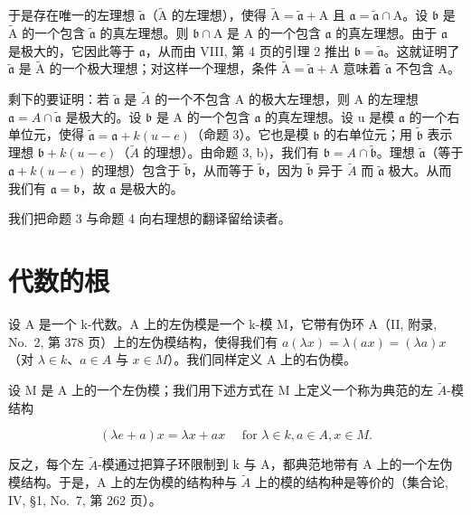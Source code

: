 于是存在唯一的左理想 \(\widetilde{\mathfrak{a}}\)（\(\widetilde{\mathrm{A}}\) 的左理想），使得 \(\widetilde{\mathrm{A}} = \widetilde{\mathfrak{a}} + \mathrm{A}\) 且 \(\mathfrak{a} = \widetilde{\mathfrak{a}} \cap \mathrm{A}\)。设 \(\mathfrak{b}\) 是 \(\widetilde{\mathrm{A}}\) 的一个包含 \(\widetilde{\mathfrak{a}}\) 的真左理想。则 \(\mathfrak{b} \cap \mathrm{A}\) 是 \(\mathrm{A}\) 的一个包含 \(\mathfrak{a}\) 的真左理想。由于 \(\mathfrak{a}\) 是极大的，它因此等于 \(\mathfrak{a}\)，从而由 VIII, 第 4 页的引理 2 推出 \(\mathfrak{b} = \widetilde{\mathfrak{a}}\)。这就证明了 \(\widetilde{\mathfrak{a}}\) 是 \(\widetilde{\mathrm{A}}\) 的一个极大理想；对这样一个理想，条件 \(\widetilde{\mathrm{A}} = \widetilde{\mathfrak{a}} + \mathrm{A}\) 意味着 \(\widetilde{\mathfrak{a}}\) 不包含 A。

剩下的要证明：若 \(\widetilde{\mathfrak{a}}\) 是 \(\tilde{A}\) 的一个不包含 A 的极大左理想，则 A 的左理想 \(\mathfrak{a} = A \cap \widetilde{\mathfrak{a}}\) 是极大的。设 \(\mathfrak{b}\) 是 A 的一个包含 \(\mathfrak{a}\) 的真左理想。设 u 是模 \(\mathfrak{a}\) 的一个右单位元，使得 \(\widetilde{\mathfrak{a}} = \mathfrak{a} + k(u - e)\)（命题 3）。它也是模 \(\mathfrak{b}\) 的右单位元；用 \(\widetilde{\mathfrak{b}}\) 表示理想 \(\mathfrak{b} + k(u - e)\)（\(\tilde{A}\) 的理想）。由命题 3, b)，我们有 \(\mathfrak{b} = A \cap \widetilde{\mathfrak{b}}\)。理想 \(\widetilde{\mathfrak{a}}\)（等于 \(\mathfrak{a} + k(u - e)\) 的理想）包含于 \(\widetilde{\mathfrak{b}}\)，从而等于 \(\widetilde{\mathfrak{b}}\)，因为 \(\widetilde{\mathfrak{b}}\) 异于 \(\tilde{A}\) 而 \(\widetilde{\mathfrak{a}}\) 极大。从而我们有 \(\mathfrak{a} = \mathfrak{b}\)，故 \(\mathfrak{a}\) 是极大的。

我们把命题 3 与命题 4 向右理想的翻译留给读者。

\section{代数的根}

设 A 是一个 k-代数。A 上的左伪模是一个 k-模 M，它带有伪环 A（II, 附录, No.~2, 第 378 页）上的左伪模结构，使得我们有 \(a(\lambda x) = \lambda(ax) = (\lambda a)x\)（对 \(\lambda \in k\)、\(a \in A\) 与 \(x \in M\)）。我们同样定义 A 上的右伪模。

设 M 是 A 上的一个左伪模；我们用下述方式在 M 上定义一个称为典范的左 \(\tilde{A}\)-模结构

\[
(\lambda e + a) x = \lambda x + a x \quad \text { for } \lambda \in k, a \in A, x \in M.
\]

反之，每个左 \(\widetilde{A}\)-模通过把算子环限制到 k 与 A，都典范地带有 A 上的一个左伪模结构。于是，A 上的左伪模的结构种与 \(\widetilde{A}\) 上的模的结构种是等价的（集合论, IV, §1, No.~7, 第 262 页）。

